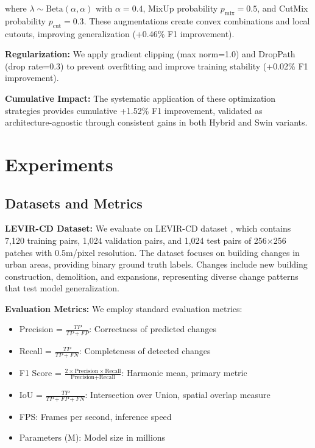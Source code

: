\documentclass[journal]{IEEEtran}
\begin{document}
{where $\lambda \sim \text{Beta}(\alpha, \alpha)$ with $\alpha=0.4$, MixUp probability $p_{\text{mix}}=0.5$, and CutMix probability $p_{\text{cut}}=0.3$. These augmentations create convex combinations and local cutouts, improving generalization (+0.46\% F1 improvement).

\textbf{Regularization:} We apply gradient clipping (max norm=1.0) and DropPath (drop rate=0.3) to prevent overfitting and improve training stability (+0.02\% F1 improvement).

\textbf{Cumulative Impact:} The systematic application of these optimization strategies provides cumulative +1.52\% F1 improvement, validated as architecture-agnostic through consistent gains in both Hybrid and Swin variants.

\section{Experiments}

\subsection{Datasets and Metrics}

\textbf{LEVIR-CD Dataset:} We evaluate on LEVIR-CD dataset \cite{changeforemer}, which contains 7,120 training pairs, 1,024 validation pairs, and 1,024 test pairs of 256$\times$256 patches with 0.5m/pixel resolution. The dataset focuses on building changes in urban areas, providing binary ground truth labels. Changes include new building construction, demolition, and expansions, representing diverse change patterns that test model generalization.

\textbf{Evaluation Metrics:} We employ standard evaluation metrics:
\begin{itemize}
\item Precision = $\frac{TP}{TP + FP}$: Correctness of predicted changes
\item Recall = $\frac{TP}{TP + FN}$: Completeness of detected changes
\item F1 Score = $\frac{2 \times \text{Precision} \times \text{Recall}}{\text{Precision} + \text{Recall}}$: Harmonic mean, primary metric
\item IoU = $\frac{TP}{TP + FP + FN}$: Intersection over Union, spatial overlap measure
\item FPS: Frames per second, inference speed
\item Parameters (M): Model size in millions
\end{itemize}

}
\end{document}
